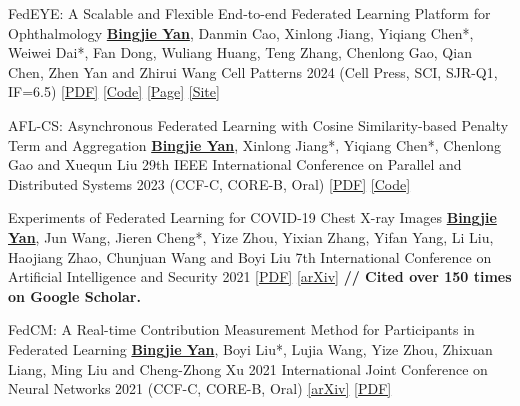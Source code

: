 \begin{cvpublications}
\cvpublication
{FedEYE: A Scalable and Flexible End-to-end Federated Learning Platform for Ophthalmology} %
{\underline{\textbf{Bingjie Yan}}, Danmin Cao, Xinlong Jiang, Yiqiang Chen*, Weiwei Dai*, Fan Dong, Wuliang Huang, Teng Zhang, Chenlong Gao, Qian Chen, Zhen Yan and Zhirui Wang} %
{Cell Patterns} %
{2024} %
{(Cell Press, SCI, SJR-Q1, IF=6.5)} %
{\href{https://www.cell.com/patterns/fulltext/S2666-3899(24)00019-9}{[PDF]} \href{https://github.com/beiyuouo/FedEYE}{[Code]} \href{https://www.bj-yan.top/FedEYE/}{[Page]} \href{https://fedeye.aierchina.com/}{[Site]}} %


\cvpublication
{AFL-CS: Asynchronous Federated Learning with Cosine Similarity-based Penalty Term and Aggregation} %
{\underline{\textbf{Bingjie Yan}}, Xinlong Jiang*, Yiqiang Chen*, Chenlong Gao and Xuequn Liu} %
{29th IEEE International Conference on Parallel and Distributed Systems} %
{2023} %
{(CCF-C, CORE-B, \textcolor{awesome}{Oral})} %
{\href{https://ieeexplore.ieee.org/document/10476054}{[PDF]} \href{https://github.com/beiyuouo/AFL-CS-ICPADS}{[Code]}} %


\cvpublication
{Experiments of Federated Learning for COVID-19 Chest X-ray Images} %
{\underline{\textbf{Bingjie Yan}}, Jun Wang, Jieren Cheng*, Yize Zhou, Yixian Zhang, Yifan Yang, Li Liu, Haojiang Zhao, Chunjuan Wang and Boyi Liu} %
{7th International Conference on Artificial Intelligence and Security} %
{2021} %
{} %
{
	\href{https://link.springer.com/chapter/10.1007/978-3-030-78618-2_4}{[PDF]} \href{https://arxiv.org/abs/2007.05592}{[arXiv]}
	\newline \textbf{// Cited over 150 times on Google Scholar.} 
} %


\cvpublication
{FedCM: A Real-time Contribution Measurement Method for Participants in Federated Learning} %
{\underline{\textbf{Bingjie Yan}}, Boyi Liu*, Lujia Wang, Yize Zhou, Zhixuan Liang, Ming Liu and Cheng-Zhong Xu} %
{2021 International Joint Conference on Neural Networks} %
{2021} %
{(CCF-C, CORE-B, \textcolor{awesome}{Oral})} %
{\href{https://arxiv.org/abs/2009.03510}{[arXiv]} \href{https://ieeexplore.ieee.org/abstract/document/9534451/}{[PDF]}} %


\end{cvpublications}
